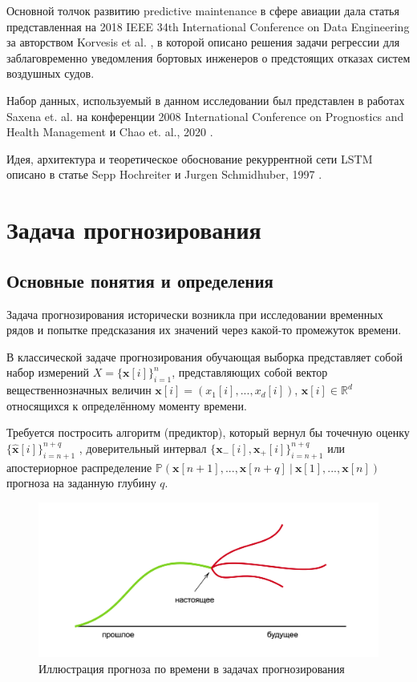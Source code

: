 \documentclass[14pt]{extarticle}
\newcommand{\R}{\mathbb{R}}
\begin{document}
Основной толчок развитию predictive maintenance в сфере авиации дала статья представленная на 2018 IEEE 34th International Conference on Data Engineering за авторством Korvesis et al. \cite{Korvesis}, в которой описано решения задачи регрессии для заблаговременно уведомления бортовых инженеров о предстоящих отказах систем воздушных судов.

Набор данных, используемый в данном исследовании был представлен в работах Saxena et. al. \cite{Saxena} на конференции 2008 International Conference on Prognostics and Health Management и Chao et. al., 2020 \cite{Chao}.

Идея, архитектура и теоретическое обоснование рекуррентной сети LSTM описано в статье Sepp Hochreiter и Jurgen Schmidhuber, 1997 \cite{Hochreiter}.


\newpage

\section{Задача прогнозирования}

\subsection{Основные понятия и определения}

Задача прогнозирования исторически возникла при исследовании временных рядов и попытке предсказания их значений через какой-то промежуток времени. 

В классической задаче прогнозирования обучающая выборка представляет собой набор измерений $X = \{\textbf{x}[i]\}_{i = 1}^n$, представляющих собой вектор
вещественнозначных величин $\textbf{x}[i] = \left(x_1[i], . . . , x_d[i]\right)$, $\textbf{x}[i] \in \R^d$ относящихся к определённому моменту времени.

Требуется постросить алгоритм (предиктор), который вернул бы точечную оценку $\{\hat{\textbf{x}}[i]\}_{i = n+1}^{n+q}$ , доверительный интервал $\{\textbf{x}_-[i], \textbf{x}_+[i]\}_{i = n+1}^{n+q}$ или апостериорное распределение $\mathbb{P}(\textbf{x}[n + 1], ... , \textbf{x}[n + q] \: | \: \textbf{x}[1], ... , \textbf{x}[n])$ прогноза на заданную глубину $q$.

\begin{figure}[h]
	\centering
	\includegraphics[width=1.0\textwidth]{img/pred_task_diagram_t.png}
	\caption{Иллюстрация прогноза по времени в задачах прогнозирования}
	\label{fig:components}
\end{figure}
\end{document}
